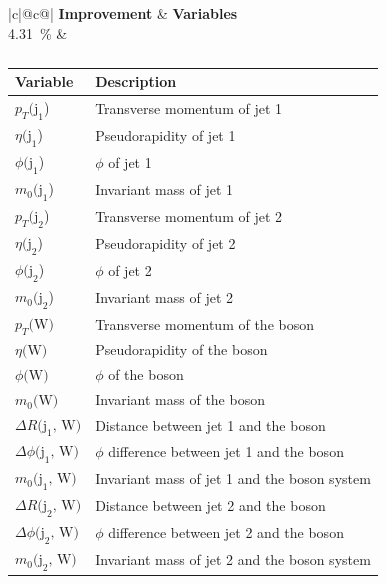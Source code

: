 \begin{table}[h]
    \centering
    \label{tab:app_vars_6}
    \caption{}
    \begin{tabular}{ |c|@{}c@{}| }
        \hline
        \textbf{Improvement} & \textbf{Variables}\\
        \hline
        \SI{4.31}{\%} & 
        \begin{tabular}{ll}
            \hline
            Variable & Description\\
            \hline
            $p_T\text{(j}_\text{1}$) & Transverse momentum of jet 1\\
            $\eta\text{(j}_\text{1}$) & Pseudorapidity of jet 1\\
            $\phi\text{(j}_\text{1}$) & $\phi$ of jet 1\\
            $m_0\text{(j}_\text{1}$) & Invariant mass of jet 1\\

            $p_T\text{(j}_\text{2}$) & Transverse momentum of jet 2\\
            $\eta\text{(j}_\text{2}$) & Pseudorapidity of jet 2\\
            $\phi\text{(j}_\text{2}$) & $\phi$ of jet 2\\
            $m_0\text{(j}_\text{2}$) & Invariant mass of jet 2\\
            
            $p_T\text{(W)}$ & Transverse momentum of the \PWplus boson\\
            $\eta\text{(W)}$ & Pseudorapidity of the \PWplus boson\\
            $\phi\text{(W)}$ & $\phi$ of the \PWplus boson\\
            $m_0\text{(W)}$ & Invariant mass of the \PWplus boson\\

            $\Delta R(\text{j}_\text{1}\text{, W)}$ & Distance between jet 1 and the \PWplus boson\\
            $\Delta \phi\text{(j}_\text{1}\text{, W)}$ & $\phi$ difference between jet 1 and the \PWplus boson\\
            $m_0\text{(j}_\text{1}\text{, W)}$ & Invariant mass of jet 1 and the \PWplus boson system\\
            
            $\Delta R\text{(j}_\text{2}\text{, W)}$ & Distance between jet 2 and the \PWplus boson\\
            $\Delta \phi\text{(j}_\text{2}\text{, W)}$ & $\phi$ difference between jet 2 and the \PWplus boson\\
            $m_0\text{(j}_\text{2}\text{, W)}$ & Invariant mass of jet 2 and the \PWplus boson system\\
            \hline
        \end{tabular}\\
        \hline
    \end{tabular}
\end{table}

